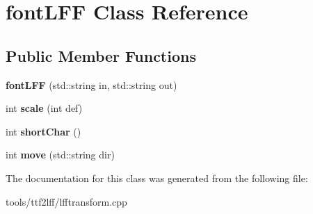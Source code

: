 \hypertarget{classfontLFF}{\section{font\-L\-F\-F Class Reference}
\label{classfontLFF}
}
\subsection*{Public Member Functions}
\begin{DoxyCompactItemize}
\item 
\hypertarget{classfontLFF_aee8fadd94580cc709b479cffa099a02a}{{\bfseries font\-L\-F\-F} (std\-::string in, std\-::string out)}\label{classfontLFF_aee8fadd94580cc709b479cffa099a02a}

\item 
\hypertarget{classfontLFF_a83eb4fc8f0b61fc390e72e0387681af5}{int {\bfseries scale} (int def)}\label{classfontLFF_a83eb4fc8f0b61fc390e72e0387681af5}

\item 
\hypertarget{classfontLFF_a6b25fcd2208f62e4f5428900e846f032}{int {\bfseries short\-Char} ()}\label{classfontLFF_a6b25fcd2208f62e4f5428900e846f032}

\item 
\hypertarget{classfontLFF_a457ad863cb22edc223a3a2b09bdeb2bd}{int {\bfseries move} (std\-::string dir)}\label{classfontLFF_a457ad863cb22edc223a3a2b09bdeb2bd}

\end{DoxyCompactItemize}


The documentation for this class was generated from the following file\-:\begin{DoxyCompactItemize}
\item 
tools/ttf2lff/lfftransform.\-cpp\end{DoxyCompactItemize}
